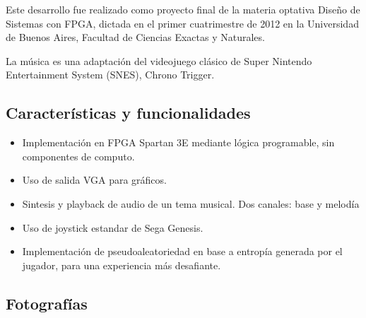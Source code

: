 \documentclass[10pt, a4paper,english,spanish]{article}
\begin{document}
Este desarrollo fue realizado como proyecto final de la materia optativa
Diseño de Sistemas con FPGA, dictada en el primer cuatrimestre de 2012
en la Universidad de Buenos Aires, Facultad de Ciencias Exactas y
Naturales.

La música es una adaptación del videojuego clásico de Super Nintendo
Entertainment System (SNES), Chrono Trigger.

\subsection{Caracter\'isticas y funcionalidades}

\begin{itemize}
	\item Implementación en FPGA Spartan 3E mediante lógica programable, sin 
	componentes de computo.
	\item Uso de salida VGA para gráficos.
	\item Sintesis y playback de audio de un tema musical. Dos canales: base y
	melod\'ia
	\item Uso de joystick estandar de Sega Genesis.
	\item Implementación de pseudoaleatoriedad en base a entropía generada por 
	el jugador, para una experiencia más desafiante.
\end{itemize}

\subsection{Fotograf\'ias}
\end{document}
